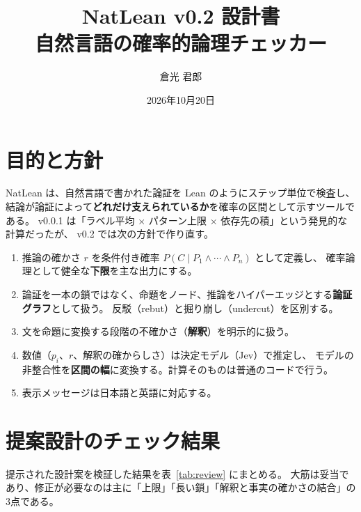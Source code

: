 \documentclass[a4paper,11pt]{ltjsarticle}
\title{NatLean v0.2 設計書\\\large 自然言語の確率的論理チェッカー}
\author{倉光 君郎}
\date{2026年10月20日}
\begin{document}
\maketitle
\tableofcontents

\section{目的と方針}

NatLean は、自然言語で書かれた論証を Lean のようにステップ単位で検査し、
結論が論証によって\textbf{どれだけ支えられているか}を確率の区間として示すツールである。
v0.0.1 は「ラベル平均 × パターン上限 × 依存先の積」という発見的な計算だったが、
v0.2 では次の方針で作り直す。

\begin{enumerate}
  \item 推論の確かさ $r$ を条件付き確率 $P(C \mid P_1 \wedge \cdots \wedge P_n)$ として定義し、
        確率論理として健全な\textbf{下限}を主な出力にする。
  \item 論証を一本の鎖ではなく、命題をノード、推論をハイパーエッジとする\textbf{論証グラフ}として扱う。
        反駁（rebut）と掘り崩し（undercut）を区別する。
  \item 文を命題に変換する段階の不確かさ（\textbf{解釈}）を明示的に扱う。
  \item 数値（$p_i$、$r$、解釈の確からしさ）は決定モデル（Jev）で推定し、
        モデルの非整合性を\textbf{区間の幅}に変換する。計算そのものは普通のコードで行う。
  \item 表示メッセージは日本語と英語に対応する。
\end{enumerate}

\section{提案設計のチェック結果}

提示された設計案を検証した結果を表~\ref{tab:review} にまとめる。
大筋は妥当であり、修正が必要なのは主に「上限」「長い鎖」「解釈と事実の確かさの結合」の3点である。
\end{document}
